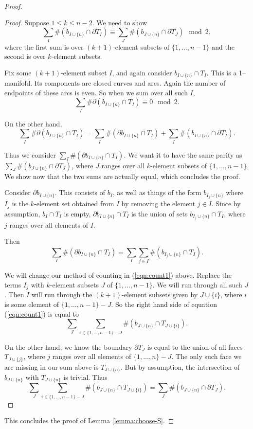 \begin{proof}
\begin{proof}
Suppose $1\leq k \leq n-2$.  We need to show
$$\sum_I \#(b_{I\cup\{n\}} \cap \partial T_I) \equiv \sum_{J}
\#(b_{J\cup\{n\}} \cap \partial T_J) \mod 2,$$
where the first sum is over $(k+1)$-element subsets of $\{1, \dots,
n-1\}$ and the second is over $k$-element subsets.

Fix some $(k+1)$-element subset $I$, and again consider
$b_{I\cup\{n\}} \cap T_I$.  This is a 1--manifold.  Its components are
closed curves and arcs.  Again the number of endpoints of
these arcs is even.  So when we sum over all such $I$, 
$$\sum_I \#\partial(b_{I\cup\{n\}} \cap T_I) \equiv 0 \mod 2.$$

On the other hand, 
$$\sum_I \#\partial(b_{I\cup\{n\}} \cap T_I) =
\sum_I \#(\partial b_{I\cup\{n\}} \cap T_I) +
\sum_I \#(b_{I\cup\{n\}} \cap \partial T_I).$$

Thus we consider $\sum_I \#(\partial b_{I\cup\{n\}} \cap T_I).$ We
want it to have the same parity as $\sum_J \#(b_{J\cup\{n\}} \cap
\partial T_J)$, where $J$ ranges over all $k$-element subsets of $\{1,
\dots, n-1\}$.  We show now that the two sums are actually equal,
which concludes the proof.

Consider $\partial b_{I\cup \{n\}}$.  This consists of $b_I$, as well
as things of the form $b_{{I_j}\cup\{n\}}$ where $I_j$ is the
$k$-element set obtained from $I$ by removing the element $j\in I$.
Since by assumption, $b_I \cap T_I$ is empty, $\partial b_{I\cup\{n\}}
\cap T_I$ is the union of sets $b_{{I_j}\cup\{n\}} \cap T_I$, where
$j$ ranges over all elements of $I$.

Then
\begin{equation}
\sum_I \#(\partial b_{I\cup\{n\}} \cap T_I) = \sum_I \sum_{j\in I}
\#(b_{{I_j}\cup\{n\}} \cap T_I).
\label{eqn:count1}
\end{equation}

We will change our method of counting in (\ref{eqn:count1}) above.
Replace the terms $I_j$ with $k$-element subsets $J$ of $\{1, \dots,
n-1\}$.  We will run through all such $J$.  Then $I$ will run through
the $(k+1)$-element subsets given by $J\cup\{i\}$, where $i$ is some
element of $\{1, \dots, n-1\} - J$.  So the right hand side of
equation (\ref{eqn:count1}) is equal to
$$\sum_J \sum_{i\in\{1,\dots,n-1\}-J} \#(b_{J\cup\{n\}} \cap
T_{J\cup\{i\}}).$$

On the other hand, we know the boundary $\partial T_J$ is equal to the
union of all faces $T_{J\cup\{j\}}$, where $j$ ranges over all
elements of $\{1, \dots, n\}-J$.  The only such face we are missing in
our sum above is $T_{J\cup\{n\}}$.  But by assumption, the
intersection of $b_{J\cup\{n\}}$ with $T_{J\cup\{n\}}$ is trivial.
Thus
$$\sum_J \sum_{i\in\{1,\dots,n-1\}-J} \#(b_{J\cup\{n\}} \cap
T_{J\cup\{i\}}) = \sum_J \#(b_{J\cup\{n\}} \cap \partial T_J).$$
\end{proof}

This concludes the proof of Lemma \ref{lemma:choose-S}.
\end{proof}

